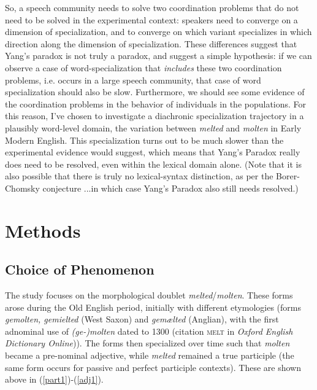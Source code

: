 \documentclass{artikel3}
\begin{document}
So, a speech community needs to solve two coordination problems that do not need to be solved in the experimental context: speakers need to converge on a dimension of specialization, and to converge on which variant specializes in which direction along the dimension of specialization. These differences suggest that Yang's paradox is not truly a paradox, and suggest a simple hypothesis: if we can observe a case of word-specialization that \textsl{includes} these two coordination problems, i.e. occurs in a large speech community, that case of word specialization should also be slow. Furthermore, we should see some evidence of the coordination problems in the behavior of individuals in the populations. For this reason, I've chosen to investigate a diachronic specialization trajectory in a plausibly word-level domain, the variation between \textsl{melted} and \textsl{molten} in Early Modern English. This specialization turns out to be much slower than the experimental evidence would suggest, which means that Yang's Paradox really does need to be resolved, even within the lexical domain alone. (Note that it is also possible that there is truly no lexical-syntax distinction, as per the Borer-Chomsky conjecture \citep{baker2008}...in which case Yang's Paradox also still needs resolved.)



\section{Methods}
\label{methods}

\subsection{Choice of Phenomenon}

The study focuses on the morphological doublet \textsl{melted}/\textsl{molten}. These forms arose during the Old English period, initially with different etymologies (forms \textsl{gemolten, gemielted} (West Saxon) and \textsl{gemælted} (Anglian), with the first adnominal use of \textsl{(ge-)molten} dated to 1300 (citation \textsc{melt} in \textsl{Oxford English Dictionary Online})). The forms then specialized over time such that \textsl{molten} became a pre-nominal adjective, while \textsl{melted} remained a true participle (the same form occurs for passive and perfect participle contexts). These are shown above in (\ref{part1})-(\ref{adj1}). 
\end{document}
